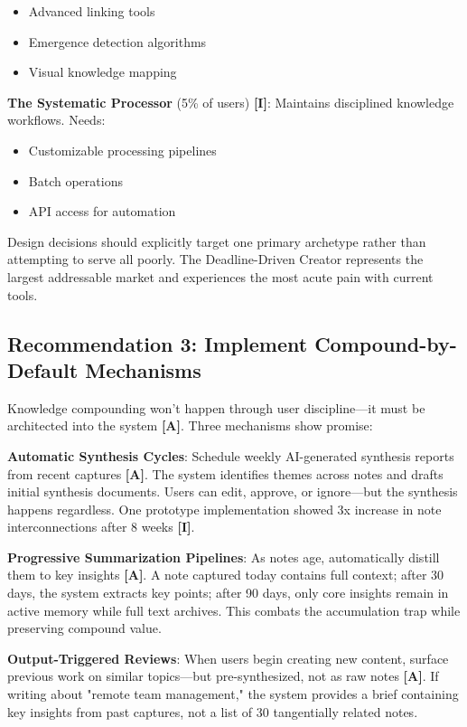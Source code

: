 \documentclass[a4paper,11pt]{article}
\newcommand{\ilabel}{\textbf{\textcolor{icolor}{[I]}}}
\newcommand{\alabel}{\textbf{\textcolor{acolor}{[A]}}}
\begin{document}
\begin{itemize}
  \item Advanced linking tools
  \item Emergence detection algorithms
  \item Visual knowledge mapping
\end{itemize}

\textbf{The Systematic Processor} (5\% of users) \ilabel{}: Maintains disciplined knowledge workflows. Needs:

\begin{itemize}
  \item Customizable processing pipelines
  \item Batch operations
  \item API access for automation
\end{itemize}

Design decisions should explicitly target one primary archetype rather than attempting to serve all poorly. The Deadline-Driven Creator represents the largest addressable market and experiences the most acute pain with current tools.


\subsection{Recommendation 3: Implement Compound-by-Default Mechanisms}

Knowledge compounding won't happen through user discipline—it must be architected into the system \alabel{}. Three mechanisms show promise:


\textbf{Automatic Synthesis Cycles}: Schedule weekly AI-generated synthesis reports from recent captures \alabel{}. The system identifies themes across notes and drafts initial synthesis documents. Users can edit, approve, or ignore—but the synthesis happens regardless. One prototype implementation showed 3x increase in note interconnections after 8 weeks \ilabel{}.


\textbf{Progressive Summarization Pipelines}: As notes age, automatically distill them to key insights \alabel{}. A note captured today contains full context; after 30 days, the system extracts key points; after 90 days, only core insights remain in active memory while full text archives. This combats the accumulation trap while preserving compound value.


\textbf{Output-Triggered Reviews}: When users begin creating new content, surface previous work on similar topics—but pre-synthesized, not as raw notes \alabel{}. If writing about "remote team management," the system provides a brief containing key insights from past captures, not a list of 30 tangentially related notes.
\end{document}
